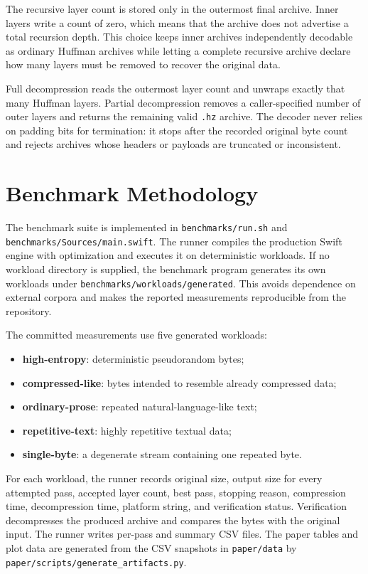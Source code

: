 \documentclass[conference]{IEEEtran}
\begin{document}
The recursive layer count is stored only in the outermost final archive. Inner layers write a count of zero, which means that the archive does not advertise a total recursion depth. This choice keeps inner archives independently decodable as ordinary Huffman archives while letting a complete recursive archive declare how many layers must be removed to recover the original data.

Full decompression reads the outermost layer count and unwraps exactly that many Huffman layers. Partial decompression removes a caller-specified number of outer layers and returns the remaining valid \texttt{.hz} archive. The decoder never relies on padding bits for termination: it stops after the recorded original byte count and rejects archives whose headers or payloads are truncated or inconsistent.

\section{Benchmark Methodology}

The benchmark suite is implemented in \texttt{benchmarks/run.sh} and \texttt{benchmarks/Sources/main.swift}. The runner compiles the production Swift engine with optimization and executes it on deterministic workloads. If no workload directory is supplied, the benchmark program generates its own workloads under \texttt{benchmarks/workloads/generated}. This avoids dependence on external corpora and makes the reported measurements reproducible from the repository.

The committed measurements use five generated workloads:
\begin{itemize}
    \item \textbf{high-entropy}: deterministic pseudorandom bytes;
    \item \textbf{compressed-like}: bytes intended to resemble already compressed data;
    \item \textbf{ordinary-prose}: repeated natural-language-like text;
    \item \textbf{repetitive-text}: highly repetitive textual data;
    \item \textbf{single-byte}: a degenerate stream containing one repeated byte.
\end{itemize}

For each workload, the runner records original size, output size for every attempted pass, accepted layer count, best pass, stopping reason, compression time, decompression time, platform string, and verification status. Verification decompresses the produced archive and compares the bytes with the original input. The runner writes per-pass and summary CSV files. The paper tables and plot data are generated from the CSV snapshots in \texttt{paper/data} by \texttt{paper/scripts/generate\_artifacts.py}.
\end{document}
